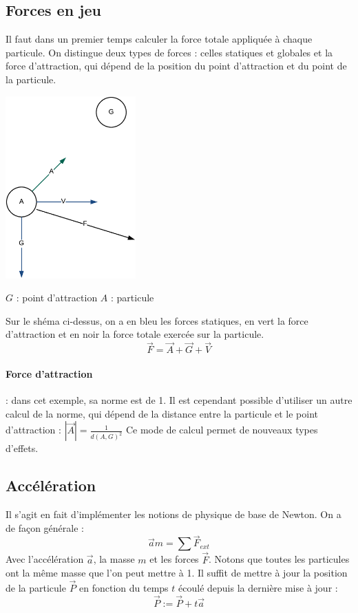 \documentclass[a4paper,10pt]{article}
\begin{document}
\subsection{Forces en jeu}
Il faut dans un premier temps calculer la force totale appliquée à chaque particule.
On distingue deux types de forces : celles statiques et globales et la force d'attraction, qui dépend de la position du point d'attraction et du point de la particule.

\begin{center}
 \includegraphics[width=5cm]{img/forces.eps}
\end{center}
\begin{center}
 $G$ : point d'attraction \hspace{3cm} $A$ : particule
\end{center}


Sur le shéma ci-dessus, on a en bleu les forces statiques, en vert la force d'attraction et en noir la force totale exercée sur la particule.
$$\vec{F} = \vec{A} + \vec{G} + \vec{V}$$

\paragraph{Force d'attraction} : dans cet exemple, sa norme est de 1.
Il est cependant possible d'utiliser un autre calcul de la norme, qui dépend de la distance entre la particule et le point d'attraction :
$|\vec{A}|=\frac{1}{d(A,G)^2}$
Ce mode de calcul permet de nouveaux types d'effets.
\subsection{Accélération}
Il s'agit en fait d'implémenter les notions de physique de base de Newton.
On a de façon générale :
$$\vec{a}m = \sum\vec{F}_{ext}$$
Avec l'accélération $\vec{a}$, la masse $m$ et les forces $\vec{F}$.
Notons que toutes les particules ont la même masse que l'on peut mettre à 1.
Il suffit de mettre à jour la position de la particule $\vec{P}$ en fonction du temps $t$ écoulé depuis la dernière mise à jour :
$$\vec{P} := \vec{P} + t \vec{a}$$
\end{document}
